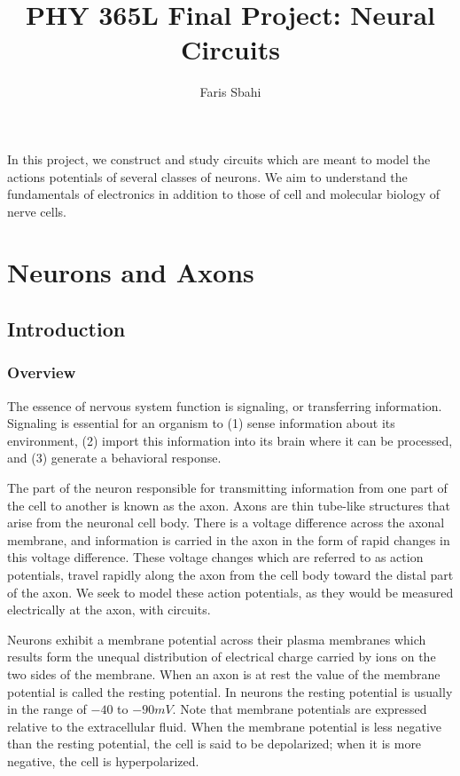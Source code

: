 \documentclass[12]{book}
\title{PHY 365L Final Project: Neural Circuits}
\author{Faris Sbahi}
\newcommand\0{\mathbf{0}}
\newcommand\<{\langle}
\renewcommand\>{\rangle}
\begin{document}
\maketitle


In this project, we construct and study circuits which are meant to model the actions potentials of several classes of neurons. We aim to understand the fundamentals of electronics in addition to those of cell and molecular biology of nerve cells.

\chapter{Neurons and Axons}

\section{Introduction}

\subsection{Overview}

The essence of nervous system function is signaling, or transferring information. Signaling is essential for an organism to (1) sense information about its environment, (2) import this information into its brain where it can be processed, and (3) generate a behavioral response.

The part of the neuron responsible for transmitting information from one part of the cell to another is known as the axon. Axons are thin tube-like structures that arise from the neuronal cell body. There is a voltage difference across the axonal membrane, and information is carried in the axon in the form of rapid changes in this voltage difference. These voltage changes which are referred to as action potentials, travel rapidly along the axon from the cell body toward the distal part of the axon. We seek to model these action potentials, as they would be measured electrically at the axon, with circuits.

Neurons exhibit a membrane potential across their plasma membranes which results form the unequal distribution of electrical charge carried by ions on the two sides of the membrane. When an axon is at rest the value of the membrane potential is called the resting potential. In neurons the resting potential is usually in the range of $-40$ to $-90 mV$. Note that membrane potentials are expressed relative to the extracellular fluid. When the membrane potential is less negative than the resting potential, the cell is said to be depolarized; when it is more negative, the cell is hyperpolarized.
\end{document}
